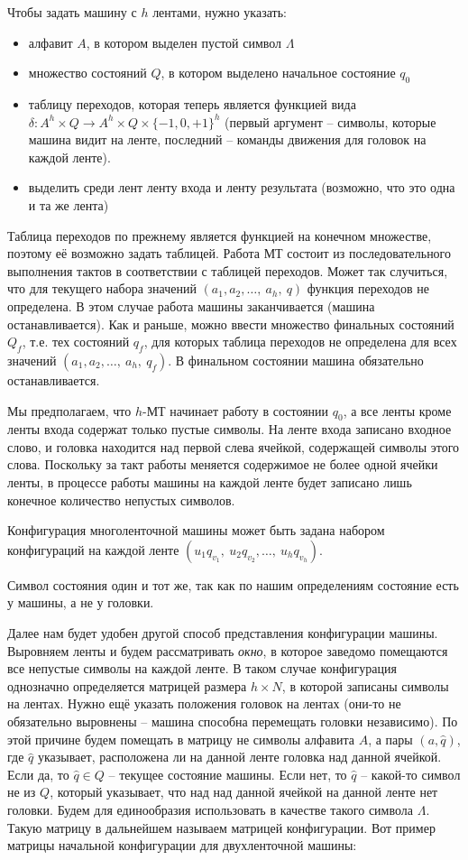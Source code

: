 Чтобы задать машину с $h$ лентами, нужно указать: 

\begin{itemize}
	\item алфавит $A$, в котором выделен пустой символ $\Lambda$
	\item множество состояний $Q$, в котором выделено начальное состояние $q_0$
	\item таблицу переходов, которая теперь является функцией вида $\delta : A^h \times Q \to A^h \times Q \times \{-1, 0, +1\}^h$ (первый аргумент -- символы, которые машина видит на ленте, последний -- команды движения для головок на каждой ленте).
	\item выделить среди лент ленту входа и ленту результата (возможно, что это одна и та же лента)
\end{itemize}

Таблица переходов по прежнему является функцией на конечном множестве, поэтому её возможно задать таблицей.
Работа МТ состоит из последовательного выполнения тактов в соответствии с таблицей переходов. Может так случиться, что для текущего набора значений $(a_1, a_2, \ldots ,\ a_h,\ q)$ функция переходов не определена. В этом случае работа машины заканчивается (машина останавливается). Как и раньше, можно ввести множество финальных состояний $Q_f$, т.е. тех состояний $q_f$, для которых таблица переходов не определена для всех значений $(a_1, a_2, \ldots ,\ a_h,\ q_f)$. В финальном состоянии машина обязательно останавливается.

Мы предполагаем, что $h$-МТ начинает работу в состоянии $q_0$, а все ленты кроме ленты входа содержат только пустые символы. На ленте входа записано входное слово, и головка находится над первой слева ячейкой, содержащей символы этого
слова. Поскольку за такт работы меняется содержимое не более одной ячейки ленты, в процессе работы машины на каждой ленте будет записано лишь конечное количество непустых символов.

Конфигурация многоленточной машины может быть задана набором конфигураций на каждой ленте $(u_1q_{v_1},\ u_2q_{v_2}, \ldots ,\ u_hq_{v_h})$.

Символ состояния один и тот же, так как по нашим определениям состояние есть у машины, а не у головки.

Далее нам будет удобен другой способ представления конфигурации машины. Выровняем ленты и будем рассматривать \textit{окно}, в которое заведомо помещаются все непустые символы на каждой ленте. В таком случае конфигурация однозначно определяется матрицей размера $h \times N$, в которой записаны символы на лентах. Нужно ещё указать положения головок на лентах (они-то не обязательно выровнены -- машина способна перемещать головки независимо). По этой причине будем помещать в матрицу не символы алфавита $A$, а пары $(a, \hat{q})$, где $\hat{q}$ указывает, расположена ли на данной ленте головка над данной ячейкой. Если да, то $\hat{q} \in Q$ -- текущее состояние машины. Если нет, то $\hat{q}$ -- какой-то символ не из $Q$, который указывает,
что над над данной ячейкой на данной ленте нет головки. Будем для единообразия использовать в качестве такого символа $\Lambda$. Такую матрицу в дальнейшем называем
матрицей конфигурации. Вот пример матрицы начальной конфигурации для двухленточной машины:

